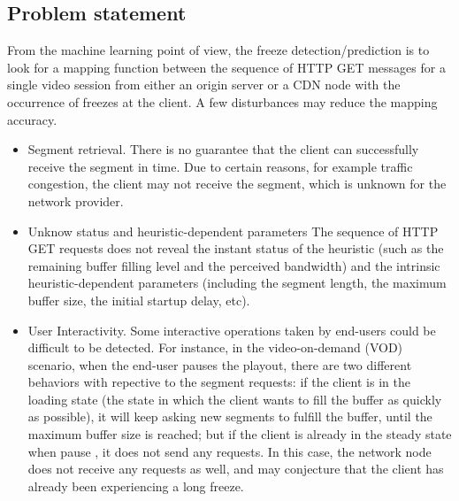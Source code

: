 \documentclass[journal]{IEEEtran}
\begin{document}
\subsection{Problem statement}
From the machine learning point of view, the freeze detection/prediction is to look for a mapping function between the sequence of HTTP GET messages for a single video session from either an origin server or a CDN node with the occurrence of freezes at the client. A few disturbances may reduce the mapping accuracy. 
\begin{itemize}
\item {Segment retrieval}. There is no guarantee that the client can successfully receive the segment in time. Due to certain reasons, for example traffic congestion, the client may not receive the segment, which is unknown for the network provider. 
\item{Unknow status and heuristic-dependent parameters}
The sequence of HTTP GET requests does not reveal the instant status of the heuristic (such as the remaining buffer filling level and the perceived bandwidth) and the intrinsic heuristic-dependent parameters (including the segment length, the maximum buffer size, the initial startup delay, etc). 
\item{User Interactivity}. Some interactive operations taken by end-users could be difficult to be detected. For instance, in the video-on-demand (VOD) scenario, when the end-user pauses the playout, there are two different behaviors with repective to the segment requests: if the client is in the loading state (the state in which the client wants to fill the buffer as quickly as possible), it will keep asking new segments to fulfill the buffer, until the maximum buffer size is reached; but if the client is already in the steady state when pause , it does not send any requests. In this case, the network node does not receive any requests as well, and may conjecture that the client has already been experiencing a long freeze. 
\end{itemize}

\end{document}
